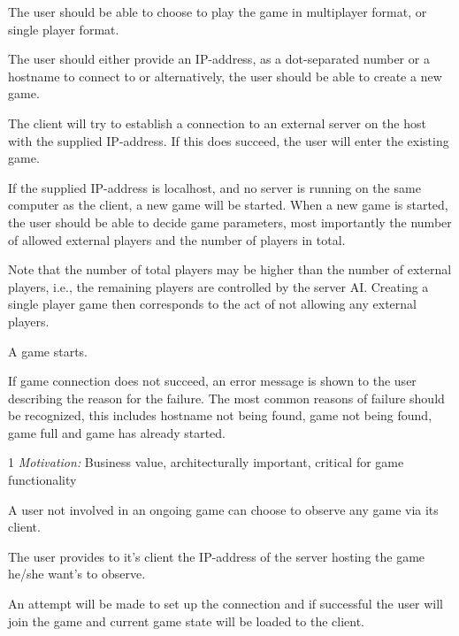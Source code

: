 
The user should be able to choose to play the game in multiplayer format, or single player format.

The user should either provide an IP-address, as a dot-separated number or a hostname to connect to or alternatively, the user should be able to create a new game.

The client will try to establish a connection to an external server on the host with the supplied IP-address. 
If this does succeed, the user will enter the existing game.

If the supplied IP-address is localhost, and no server is running on the same computer as the client, a new game will be started. When a new game is started, the user should be able to decide game parameters, most importantly the number of allowed external players and the number of players in total.

Note that the number of total players may be higher than the number of external players, i.e., the remaining players are controlled by the server AI. Creating a single player game then corresponds to the act of not allowing any external players.

A game starts.

If game connection does not succeed, an error message is shown to the user describing the reason for the failure. The most common reasons of failure should be recognized, this includes hostname not being found, game not being found, game full and game has already started. 

1 \emph{Motivation:} Business value, architecturally important, critical for game functionality

\stoprequirement


A user not involved in an ongoing game can choose to observe any game via its client. 

The user provides to it's client the IP-address of the server hosting the game he/she want's to observe.

An attempt will be made to set up the connection and if successful the user will join the game and current game state will be loaded to the client.

